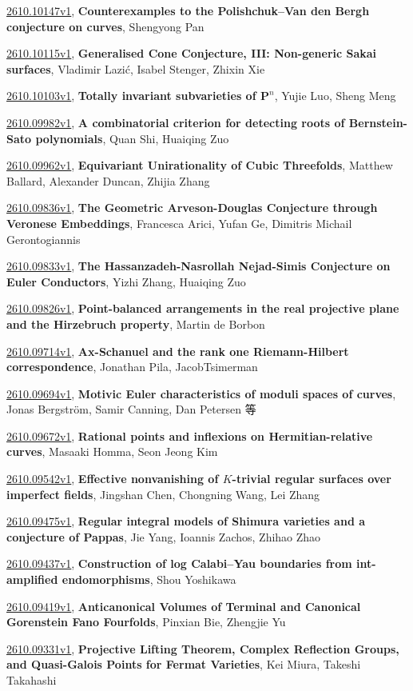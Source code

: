 \documentclass[9pt, a4paper]{article}
\theoremstyle{plain}
\theoremstyle{definition}
\theoremstyle{remark}
\newcommand{\arxiv}[3]{\href{https://arxiv.org/abs/#1}{#1}, \textbf{\textcolor{arxivblue}{#2}}, #3}
\begin{document}
\arxiv{2610.10147v1}{Counterexamples to the Polishchuk--Van den Bergh conjecture on curves}{Shengyong Pan}

\arxiv{2610.10115v1}{Generalised Cone Conjecture, III: Non-generic Sakai surfaces}{Vladimir Lazić, Isabel Stenger, Zhixin Xie}

\arxiv{2610.10103v1}{Totally invariant subvarieties of $\mathbf P^n$}{Yujie Luo, Sheng Meng}

\arxiv{2610.09982v1}{A combinatorial criterion for detecting roots of Bernstein-Sato polynomials}{Quan Shi, Huaiqing Zuo}

\arxiv{2610.09962v1}{Equivariant Unirationality of Cubic Threefolds}{Matthew Ballard, Alexander Duncan, Zhijia Zhang}

\arxiv{2610.09836v1}{The Geometric Arveson-Douglas Conjecture through Veronese Embeddings}{Francesca Arici, Yufan Ge, Dimitris Michail Gerontogiannis}

\arxiv{2610.09833v1}{The Hassanzadeh-Nasrollah Nejad-Simis Conjecture on Euler Conductors}{Yizhi Zhang, Huaiqing Zuo}

\arxiv{2610.09826v1}{Point-balanced arrangements in the real projective plane and the Hirzebruch property}{Martin de Borbon}

\arxiv{2610.09714v1}{Ax-Schanuel and the rank one Riemann-Hilbert correspondence}{Jonathan Pila,  JacobTsimerman}

\arxiv{2610.09694v1}{Motivic Euler characteristics of moduli spaces of curves}{Jonas Bergström, Samir Canning, Dan Petersen 等}

\arxiv{2610.09672v1}{Rational points and inflexions on Hermitian-relative curves}{Masaaki Homma, Seon Jeong Kim}

\arxiv{2610.09542v1}{Effective nonvanishing of $K$-trivial regular surfaces over imperfect fields}{Jingshan Chen, Chongning Wang, Lei Zhang}

\arxiv{2610.09475v1}{Regular integral models of Shimura varieties and a conjecture of Pappas}{Jie Yang, Ioannis Zachos, Zhihao Zhao}

\arxiv{2610.09437v1}{Construction of log Calabi--Yau boundaries from int-amplified endomorphisms}{Shou Yoshikawa}

\arxiv{2610.09419v1}{Anticanonical Volumes of Terminal and Canonical Gorenstein Fano Fourfolds}{Pinxian Bie, Zhengjie Yu}

\arxiv{2610.09331v1}{Projective Lifting Theorem, Complex Reflection Groups, and Quasi-Galois Points for Fermat Varieties}{Kei Miura, Takeshi Takahashi}
\end{document}
